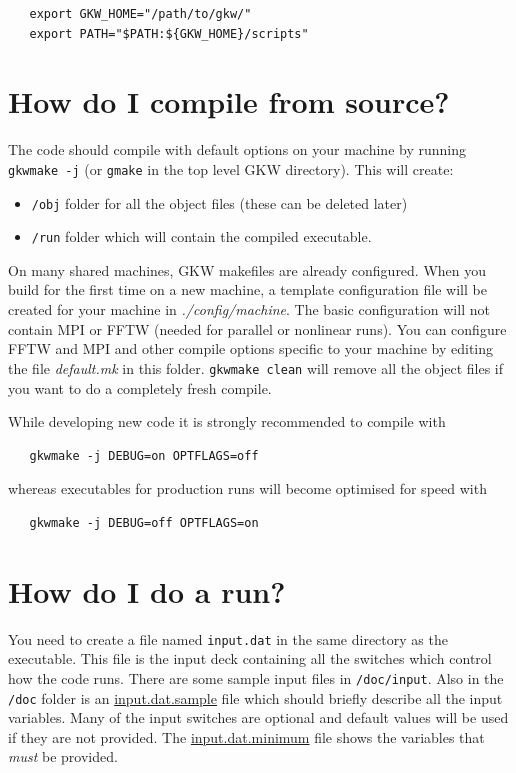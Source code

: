 \documentclass[a4paper,10pt]{article}
\newcommand{\doc}[1]{\href{http://bitbucket.org/gkw/gkw/src/HEAD/doc/#1}{#1}}
\begin{document}
\begin{verbatim}
   export GKW_HOME="/path/to/gkw/"
   export PATH="$PATH:${GKW_HOME}/scripts"
\end{verbatim}

\section{How do I compile from source?}

The code should compile with default options on your machine by running \texttt{gkwmake -j} (or \texttt{gmake} in the top level GKW directory). This will create:
\begin{itemize}
\item \texttt{/obj} folder for all the object files (these can be deleted later)
\item \texttt{/run} folder which will contain the compiled executable. 
\end{itemize}

On many shared machines, GKW makefiles are already configured.  
When you build for the first time on a new machine, a template configuration file will be created for your machine in \textit{./config/machine}.  
The basic configuration will not contain MPI or FFTW (needed for parallel or nonlinear runs).
You can configure FFTW and MPI and other compile options specific to your machine by editing the file \textit{default.mk} in this folder. 
\texttt{gkwmake clean} will remove all the object files if you want to do a completely fresh compile.

While developing new code it is strongly recommended to compile with
\begin{verbatim}
   gkwmake -j DEBUG=on OPTFLAGS=off
\end{verbatim}
whereas executables for production runs will become optimised for speed with
\begin{verbatim}
   gkwmake -j DEBUG=off OPTFLAGS=on
\end{verbatim}

\section{How do I do a run?}

You need to create a file named \texttt{input.dat} in the same
directory as the executable.  This file is the input deck containing
all the switches which control how the code runs.  There are some
sample input files in \texttt{/doc/input}. Also in the \texttt{/doc}
folder is an \doc{input.dat.sample} file which should briefly describe
all the input variables. Many of the input switches are optional and
default values will be used if they are not provided.  The
\doc{input.dat.minimum} file shows the variables that \textit{must} be
provided.
\end{document}
